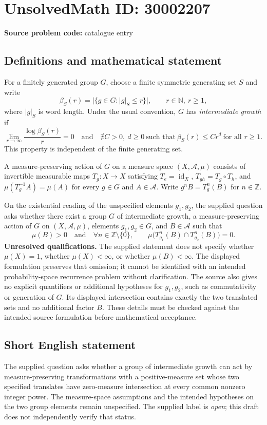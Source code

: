 \documentclass[11pt]{article}
\newcommand{\N}{\mathbb{N}}
\newcommand{\Z}{\mathbb{Z}}
\begin{document}
\section*{UnsolvedMath ID: 30002207}
\textbf{Source problem code:} catalogue entry
\subsection{Definitions and mathematical statement}
For a finitely generated group \(G\), choose a finite symmetric generating set \(S\) and write
\[
\beta_S(r)=\bigl|\{g\in G:|g|_S\le r\}\bigr|,\qquad r\in\N,\ r\ge1,
\]
where \(|g|_S\) is word length. Under the usual convention, \(G\) has \emph{intermediate growth} if
\[
\lim_{r\to\infty}\frac{\log\beta_S(r)}{r}=0
\quad\text{and}\quad
\nexists C>0,\ d\ge0\ \text{such that}\ \beta_S(r)\le Cr^d\ \text{for all }r\ge1.
\]
This property is independent of the finite generating set.

A measure-preserving action of \(G\) on a measure space \((X,\mathcal A,\mu)\) consists of invertible measurable maps \(T_g:X\to X\) satisfying \(T_e=\operatorname{id}_X\), \(T_{gh}=T_g\circ T_h\), and \(\mu(T_g^{-1}A)=\mu(A)\) for every \(g\in G\) and \(A\in\mathcal A\). Write \(g^nB=T_g^n(B)\) for \(n\in\Z\).

On the existential reading of the unspecified elements \(g_1,g_2\), the supplied question asks whether there exist a group \(G\) of intermediate growth, a measure-preserving action of \(G\) on \((X,\mathcal A,\mu)\), elements \(g_1,g_2\in G\), and \(B\in\mathcal A\) such that
\[
\mu(B)>0
\quad\text{and}\quad
\forall n\in\Z\setminus\{0\},\qquad
\mu\bigl(T_{g_1}^{n}(B)\cap T_{g_2}^{n}(B)\bigr)=0.
\]
\textbf{Unresolved qualifications.} The supplied statement does not specify whether \(\mu(X)=1\), whether \(\mu(X)<\infty\), or whether \(\mu(B)<\infty\). The displayed formulation preserves that omission; it cannot be identified with an intended probability-space recurrence problem without clarification. The source also gives no explicit quantifiers or additional hypotheses for \(g_1,g_2\), such as commutativity or generation of \(G\). Its displayed intersection contains exactly the two translated sets and no additional factor \(B\). These details must be checked against the intended source formulation before mathematical acceptance.
\subsection{Short English statement}
The supplied question asks whether a group of intermediate growth can act by measure-preserving transformations with a positive-measure set whose two specified translates have zero-measure intersection at every common nonzero integer power. The measure-space assumptions and the intended hypotheses on the two group elements remain unspecified. The supplied label is \emph{open}; this draft does not independently verify that status.
\end{document}
